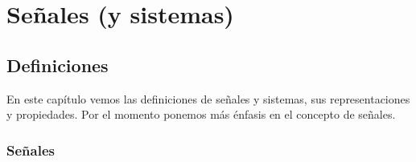 \chapter{Señales (y sistemas)}

\section{Definiciones}


En este capítulo vemos las definiciones de señales y sistemas, sus representaciones y propiedades. Por el momento ponemos más énfasis en el concepto de señales.

\subsection{Señales}

